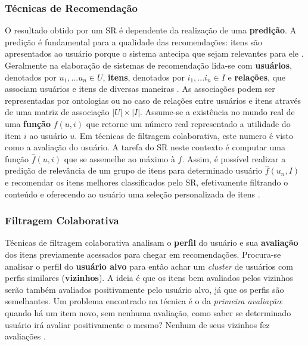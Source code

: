 \documentclass[12pt]{article}
\begin{document}
\subsubsection{Técnicas de Recomendação}

O resultado obtido por um SR é dependente da realização de uma \textbf{predição}. A predição é fundamental para a qualidade 
das recomendações: itens são apresentados ao usuário porque o sistema antecipa que sejam relevantes para ele 
\cite{ricci2011introduction}. Geralmente na elaboração de sistemas de recomendação lida-se com \textbf{usuários}, denotados por 
$ u_1, ... u_n \in U $, \textbf{itens}, denotados por $ i_1, ... i_n \in I$  e \textbf{relações}, que associam usuários e 
itens de diversas maneiras \cite{ekstrand2019recommender}. As associações podem ser representadas por ontologias 
\cite{primo2006tecnicas} ou no caso de relações entre usuários e itens através de uma matriz de associação $ |U| \times |I| $. 
Assume-se a existência no mundo real de uma \textbf{função} $ f (u, i) $ que retorne um número real representado a utilidade do 
item $i$ ao usuário $u$. Em técnicas de filtragem colaborativa, este numero é visto como a avaliação do usuário. A tarefa do SR 
neste contexto é computar uma função $\hat{f}(u, i)$ que se assemelhe ao máximo à $f$. 
Assim, é possível realizar a predição de relevância de um grupo de itens para determinado usuário $\hat{f}(u_n, I)$ e recomendar 
os itens melhores classificados pelo SR, efetivamente filtrando o conteúdo e oferecendo ao usuário uma seleção personalizada de 
itens \cite{ricci2011introduction}.

\subsubsection{Filtragem Colaborativa}

Técnicas de filtragem colaborativa analisam o \textbf{perfil} do usuário e sua \textbf{avaliação} dos itens previamente 
acessados para chegar em recomendações. Procura-se analisar o perfil do \textbf{usuário alvo} para então achar um \textit{cluster} 
de usuários com perfis similares (\textbf{vizinhos}). A ideia é que os itens bem avaliados pelos vizinhos serão também 
avaliados positivamente pelo usuário alvo, já que os perfis são semelhantes. Um problema encontrado na técnica é o da \textit{primeira avaliação}: quando há um item novo, sem nenhuma avaliação, como saber se determinado usuário irá avaliar 
positivamente o mesmo? Nenhum de seus vizinhos fez avaliações \cite{ricci2011introduction}.
\end{document}
